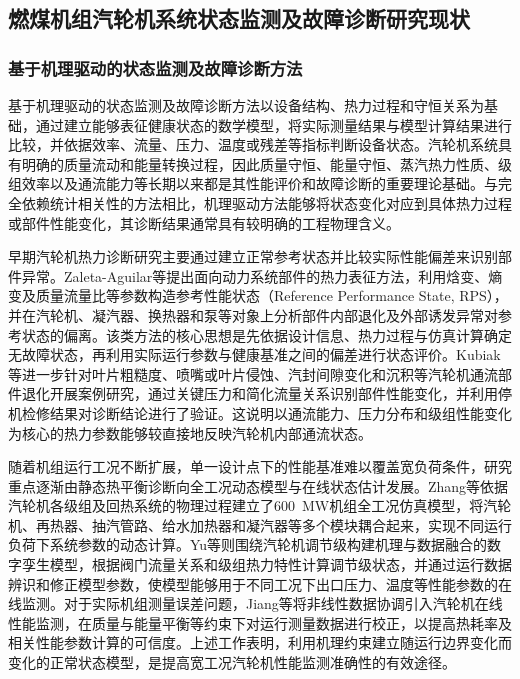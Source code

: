 \subsection{燃煤机组汽轮机系统状态监测及故障诊断研究现状}

\subsubsection{基于机理驱动的状态监测及故障诊断方法}

基于机理驱动的状态监测及故障诊断方法以设备结构、热力过程和守恒关系为基础，通过建立能够表征健康状态的数学模型，将实际测量结果与模型计算结果进行比较，并依据效率、流量、压力、温度或残差等指标判断设备状态。汽轮机系统具有明确的质量流动和能量转换过程，因此质量守恒、能量守恒、蒸汽热力性质、级组效率以及通流能力等长期以来都是其性能评价和故障诊断的重要理论基础。与完全依赖统计相关性的方法相比，机理驱动方法能够将状态变化对应到具体热力过程或部件性能变化，其诊断结果通常具有较明确的工程物理含义。

早期汽轮机热力诊断研究主要通过建立正常参考状态并比较实际性能偏差来识别部件异常。Zaleta-Aguilar等提出面向动力系统部件的热力表征方法，利用焓变、熵变及质量流量比等参数构造参考性能状态（Reference Performance State, RPS），并在汽轮机、凝汽器、换热器和泵等对象上分析部件内部退化及外部诱发异常对参考状态的偏离\cite{Zaleta2004ThermoCharacterization}。该类方法的核心思想是先依据设计信息、热力过程与仿真计算确定无故障状态，再利用实际运行参数与健康基准之间的偏差进行状态评价。Kubiak等进一步针对叶片粗糙度、喷嘴或叶片侵蚀、汽封间隙变化和沉积等汽轮机通流部件退化开展案例研究，通过关键压力和简化流量关系识别部件性能变化，并利用停机检修结果对诊断结论进行了验证\cite{Kubiak2002TurbineDegradation}。这说明以通流能力、压力分布和级组性能变化为核心的热力参数能够较直接地反映汽轮机内部通流状态。

随着机组运行工况不断扩展，单一设计点下的性能基准难以覆盖宽负荷条件，研究重点逐渐由静态热平衡诊断向全工况动态模型与在线状态估计发展。Zhang等依据汽轮机各级组及回热系统的物理过程建立了600~MW机组全工况仿真模型，将汽轮机、再热器、抽汽管路、给水加热器和凝汽器等多个模块耦合起来，实现不同运行负荷下系统参数的动态计算\cite{Zhang2018AllCondition}。Yu等则围绕汽轮机调节级构建机理与数据融合的数字孪生模型，根据阀门流量关系和级组热力特性计算调节级状态，并通过运行数据辨识和修正模型参数，使模型能够用于不同工况下出口压力、温度等性能参数的在线监测\cite{Yu2020HybridDigitalTwin}。对于实际机组测量误差问题，Jiang等将非线性数据协调引入汽轮机在线性能监测，在质量与能量平衡等约束下对运行测量数据进行校正，以提高热耗率及相关性能参数计算的可信度\cite{Jiang2014DataReconciliation}。上述工作表明，利用机理约束建立随运行边界变化而变化的正常状态模型，是提高宽工况汽轮机性能监测准确性的有效途径。

